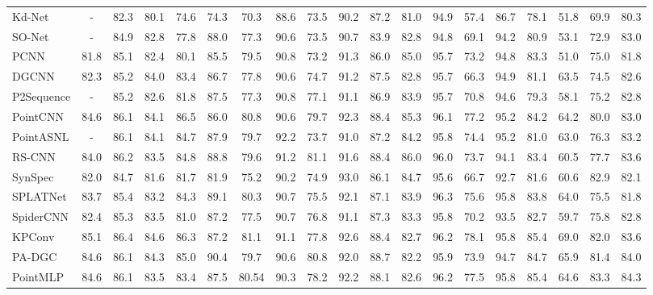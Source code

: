 \begin{table*}[]
\begin{adjustbox}{width=1\textwidth}
\begin{tabular}{l|cc|cccccccccccccccc}
         Kd-Net&-&82.3 &80.1 &74.6  &74.3 &70.3 &88.6 &73.5 &90.2 &87.2 &81.0 &94.9 &57.4 &86.7 &78.1 &51.8 &69.9 &80.3 \\
         SO-Net&-&84.9 &82.8 &77.8 &88.0 &77.3 &90.6 &73.5 &90.7 &83.9 &82.8 &94.8 &69.1 &94.2 &80.9 &53.1 &72.9 &83.0 \\
         PCNN&81.8&85.1 &82.4 &80.1 &85.5 &79.5 &90.8 &73.2 &91.3 &86.0 &85.0 &95.7 &73.2 &94.8 &83.3 &51.0 &75.0 &81.8 \\
         DGCNN&82.3&85.2 &84.0 &83.4 &86.7 &77.8 &90.6 &74.7 &91.2 &87.5 &82.8 &95.7 &66.3 &94.9 &81.1 &63.5 &74.5 &82.6 \\
         P2Sequence&-&85.2 &82.6 &81.8 &87.5 &77.3 &90.8 &77.1 &91.1 &86.9 &83.9 &95.7 &70.8 &94.6 &79.3 &58.1 &75.2 &82.8 \\
         PointCNN&84.6&86.1&84.1 &86.5 &86.0 &80.8 &90.6 &79.7 &92.3 &88.4 &85.3 &96.1 &77.2 &95.2 &84.2 &64.2 &80.0 &83.0 \\
         PointASNL&-&86.1 &84.1 &84.7 &87.9 &79.7 &92.2 &73.7 &91.0 &87.2 &84.2 &95.8 &74.4 &95.2 &81.0 &63.0 &76.3 &83.2 \\
         RS-CNN&84.0&86.2 &83.5 &84.8 &88.8 &79.6 &91.2 &81.1 &91.6 &88.4 &86.0 &96.0 &73.7 &94.1 &83.4 &60.5 &77.7 &83.6 \\
         SynSpec&82.0&84.7 &81.6 &81.7 &81.9 &75.2 &90.2 &74.9 &93.0 &86.1 &84.7 &95.6 &66.7 &92.7 &81.6 &60.6 &82.9 &82.1 \\
         SPLATNet&83.7&85.4&83.2 &84.3 &89.1 &80.3 &90.7 &75.5 &92.1 &87.1 &83.9 &96.3 &75.6 &95.8 &83.8 &64.0 &75.5 &81.8 \\
         SpiderCNN&82.4&85.3 &83.5 &81.0 &87.2 &77.5 &90.7 &76.8 &91.1 &87.3 &83.3 &95.8 &70.2 &93.5 &82.7 &59.7 &75.8 &82.8 \\
         KPConv&85.1&86.4 &84.6 &86.3 &87.2 &81.1 &91.1 &77.8 &92.6 &88.4 &82.7 &96.2 &78.1 &95.8 &85.4 &69.0 &82.0 &83.6 \\
         PA-DGC&84.6&86.1 &84.3 &85.0 &90.4 &79.7 &90.6 &80.8 &92.0 &88.7 &82.2 &95.9 &73.9 &94.7 &84.7 &65.9 &81.4 &84.0 \\
         \midrule
        PointMLP&84.6  &86.1  &83.5  &83.4 &87.5 &80.54  &90.3 &78.2 &92.2  & 88.1 &82.6  & 96.2  &77.5  &95.8  &85.4  &64.6  & 83.3 &84.3 \\
         \bottomrule
    \end{tabular}
    \end{adjustbox}
\end{table*}

